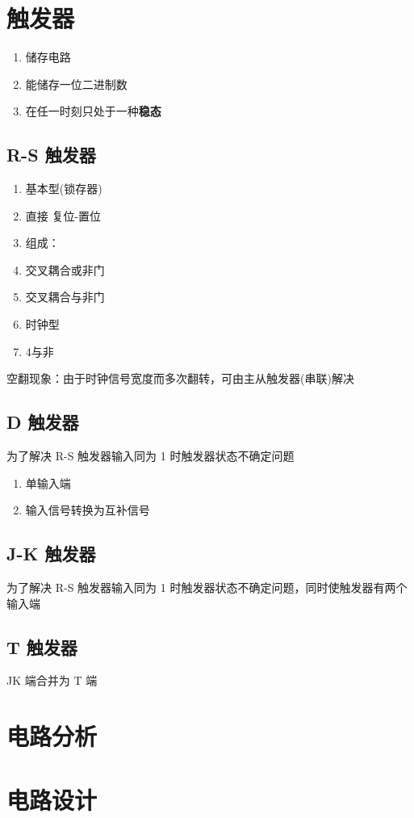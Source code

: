 \newpage

\section{触发器}

\begin{enumerate}
    \item 储存电路
    \item 能储存一位二进制数
    \item 在任一时刻只处于一种\textbf{稳态}
\end{enumerate}

\subsection{R-S 触发器}

\begin{enumerate}
    \item 基本型(锁存器)
    \item 直接 复位-置位
    \item 组成：
    \item 交叉耦合或非门
    \item 交叉耦合与非门
    \item 时钟型
    \item 4\*与非
\end{enumerate}

空翻现象：由于时钟信号宽度而多次翻转，可由主从触发器(串联)解决

\newpage

\subsection{D 触发器}

为了解决 R-S 触发器输入同为 1 时触发器状态不确定问题

\begin{enumerate}
    \item 单输入端
    \item 输入信号转换为互补信号
\end{enumerate}

\subsection{J-K 触发器}

为了解决 R-S 触发器输入同为 1 时触发器状态不确定问题，同时使触发器有两个输入端

\subsection{T 触发器}

JK 端合并为 T 端

\newpage

\section{电路分析}

\section{电路设计}

\newpage
